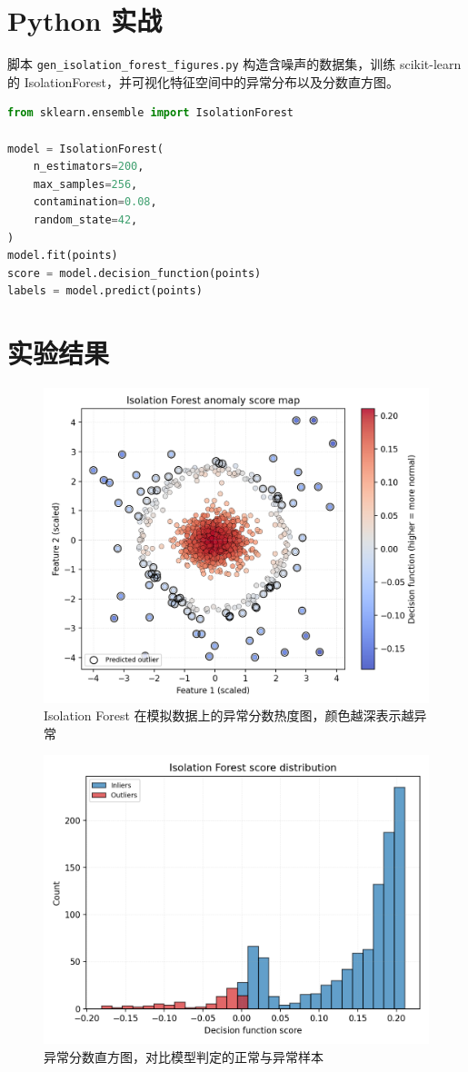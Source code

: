 \documentclass[UTF8,zihao=-4]{ctexart}
\begin{document}
\section{Python 实战}
脚本 \texttt{gen\_isolation\_forest\_figures.py} 构造含噪声的数据集，训练 scikit-learn 的 IsolationForest，并可视化特征空间中的异常分布以及分数直方图。
\begin{lstlisting}[language=Python,caption={脚本 gen_isolation_forest_figures.py 片段}]
from sklearn.ensemble import IsolationForest

model = IsolationForest(
    n_estimators=200,
    max_samples=256,
    contamination=0.08,
    random_state=42,
)
model.fit(points)
score = model.decision_function(points)
labels = model.predict(points)
\end{lstlisting}

\section{实验结果}
\begin{figure}[H]
  \centering
  \includegraphics[width=0.82\linewidth]{isolation_forest_decision.png}
  \caption{Isolation Forest 在模拟数据上的异常分数热度图，颜色越深表示越异常}
  \label{fig:isolation_forest_decision_cn}
\end{figure}

\begin{figure}[H]
  \centering
  \includegraphics[width=0.78\linewidth]{isolation_forest_score_hist.png}
  \caption{异常分数直方图，对比模型判定的正常与异常样本}
  \label{fig:isolation_forest_score_hist_cn}
\end{figure}
\end{document}
